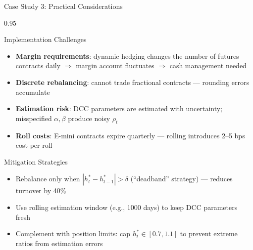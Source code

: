 \documentclass[9pt, aspectratio=169, t]{beamer}
\begin{document}
\begin{frame}{Case Study 3: Practical Considerations}
    \begin{cminipage}{0.95\textwidth}
    {\footnotesize
    \begin{block}{Implementation Challenges}
        \begin{itemize}\setlength{\itemsep}{1pt}
            \item \textbf{Margin requirements}: dynamic hedging changes the number of futures contracts daily $\Rightarrow$ margin account fluctuates $\Rightarrow$ cash management needed
            \item \textbf{Discrete rebalancing}: cannot trade fractional contracts --- rounding errors accumulate
            \item \textbf{Estimation risk}: DCC parameters are estimated with uncertainty; misspecified $\alpha, \beta$ produce noisy $\rho_t$
            \item \textbf{Roll costs}: E-mini contracts expire quarterly --- rolling introduces 2--5 bps cost per roll
        \end{itemize}
    \end{block}
    \begin{alertblock}{Mitigation Strategies}
        \begin{itemize}\setlength{\itemsep}{0pt}
            \item Rebalance only when $|h_t^* - h_{t-1}^*| > \delta$ (``deadband'' strategy) --- reduces turnover by 40\%
            \item Use rolling estimation window (e.g., 1000 days) to keep DCC parameters fresh
            \item Complement with position limits: cap $h_t^* \in [0.7, 1.1]$ to prevent extreme ratios from estimation errors
        \end{itemize}
    \end{alertblock}
    }
    \end{cminipage}
\end{frame}
\end{document}

